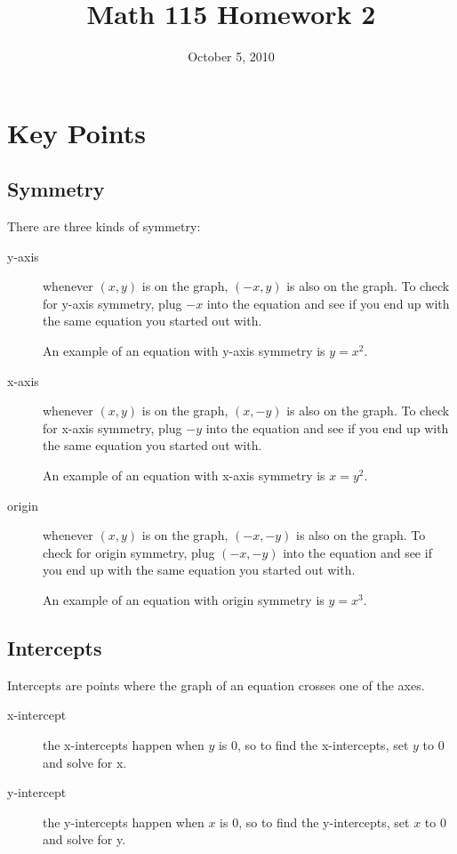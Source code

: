 \documentclass[fleqn,addpoints]{exam}
\title{Math 115 Homework 2}
\date{October 5, 2010}
\begin{document}
\maketitle

\ifprintanswers
\else
\section{Key Points}
\subsection{Symmetry}

There are three kinds of symmetry:
\begin{description}                    
  \item[y-axis] whenever $(x, y)$ is on the graph, $(-x, y)$ is also on the graph.  To check for y-axis symmetry, plug
    $-x$ into the equation and see if you end up with the same equation you started out with.  

    An example of an equation with y-axis symmetry is $y=x^2$.

  \item[x-axis] whenever $(x, y)$ is on the graph, $(x, -y)$ is also on the graph.  To check for x-axis symmetry, plug
    $-y$ into the equation and see if you end up with the same equation you started out with.

    An example of an equation with x-axis symmetry is $x=y^2$.

  \item[origin] whenever $(x, y)$ is on the graph, $(-x, -y)$ is also on the graph.  To check for origin symmetry, plug
    $(-x, -y)$ into the equation and see if you end up with the same equation you started out with.

    An example of an equation with origin symmetry is $y=x^3$.
\end{description}

\subsection{Intercepts}
Intercepts are points where the graph of an equation crosses one of the axes.
\begin{description}
  \item[x-intercept] the x-intercepts happen when $y$ is 0, so to find the x-intercepts, set $y$ to 0 and solve for x.
  \item[y-intercept] the y-intercepts happen when $x$ is 0, so to find the y-intercepts, set $x$ to 0 and solve for y.
\end{description}
\end{document}
